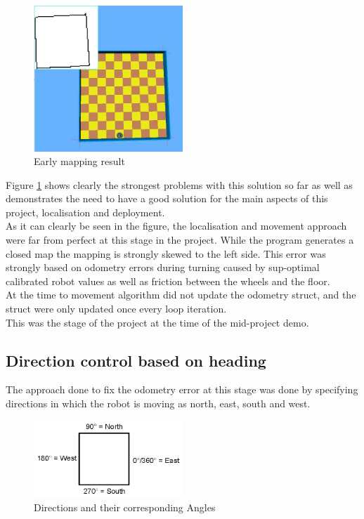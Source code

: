 \begin{figure}[h]
\centering
\includegraphics[width = 0.5\textwidth]{../../figures/early_map.jpg} 
\caption{Early mapping result}
\label{early_mapping_result}
\end{figure}

Figure \ref{early_mapping_result} shows clearly the strongest problems with this solution so far as well as demonstrates the need to have a good solution for  the main aspects of this project, localisation and deployment.\\
As it can clearly be seen in the figure, the localisation and movement approach were far from perfect at this stage in the project. 
While the program generates a closed  map the mapping is strongly skewed to the left side. This error was strongly based on odometry errors during turning caused by sup-optimal calibrated robot values as well as friction between the wheels and the floor.\\
At the time to movement algorithm did not update the odometry struct, and the struct were only updated once every loop iteration. \\
This was the stage of the project at the time of the mid-project demo.


\subsection{Direction control based on heading}
The approach done to fix the odometry error at this stage was done by specifying directions in which the robot is moving as north, east, south and west. 

\begin{figure}[h]
\centering
\includegraphics[width = 0.5\textwidth]{../../figures/direction_and_angles} 
\caption{Directions and their corresponding Angles}
\label{directions_and_angles}
\end{figure}

